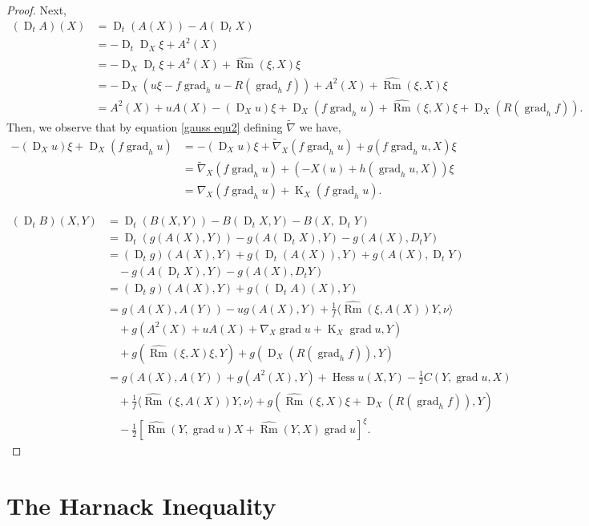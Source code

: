 \documentclass{amsart}
\theoremstyle{definition}
\theoremstyle{remark}
\newcommand{\ip}[2]{\ensuremath{\langle{#1},{#2}\rangle}}
\DeclareMathOperator{\grad}{grad}
\DeclareMathOperator{\Rm}{Rm}
\DeclareMathOperator{\hess}{Hess}
\DeclareMathOperator{\diff}{K}
\DeclareMathOperator{\D}{D}
\numberwithin{equation}{section}
\begin{document}
\begin{proof}
Next,
\[
\begin{split}
(\D_t A)(X) &= \D_t (A(X)) - A(\D_t X) \\
&= - \D_t \D_X \xi + A^2(X) \\
&= -\D_X \D_t \xi + A^2(X) + \widehat{\Rm} (\xi, X) \xi \\
&= -\D_X \left(u\xi - f\grad_h u - R(\grad_h f)\right) + A^2(X) + \widehat{\Rm} (\xi, X) \xi \\
&= A^2(X) + u A(X) -(\D_X u)\xi + \D_X (f\grad_h u) + \widehat{\Rm} (\xi, X) \xi + \D_X (R(\grad_h f)).
\end{split}
\]
Then, we observe that by equation \eqref{gauss equ2} defining $\tilde{\nabla}$ we have,
\[
\begin{split}
-(\D_X u)\xi + \D_X (f\grad_h u) &= -(\D_X u)\xi + \tilde{\nabla}_X (f\grad_h u) + g(f \grad_h u, X) \xi \\
&= \tilde{\nabla}_X (f\grad_h u) + (-X(u) + h(\grad_h u, X))\xi \\
&= \nabla_X (f\grad_h u) + \diff_X (f\grad_h u).
\end{split}
\]

\[
\begin{split}
(\D_t B) (X, Y) &= \D_t (B(X, Y)) - B(\D_t X, Y) - B(X, \D_t Y) \\
&= \D_t (g(A(X), Y)) - g(A(\D_tX), Y) - g(A(X), D_t Y) \\
&= (\D_t g)(A(X), Y) + g(\D_t(A(X)), Y) + g(A(X), \D_t Y) \\
&\quad - g(A(\D_tX), Y) - g(A(X), D_t Y) \\
&= (\D_t g)(A(X), Y) + g((\D_t A)(X), Y) \\
&= g(A(X), A(Y)) - u g(A(X), Y) + \frac{1}{f} \ip{\hat{\Rm} (\xi, A(X))Y}{\nu} \\
&\quad + g(A^2(X) + u A(X) + \nabla_X \grad u + \diff_X \grad u, Y) \\
&\quad + g(\widehat{\Rm}(\xi, X)\xi, Y) + g(\D_X (R(\grad_h f)), Y) \\
&= g(A(X), A(Y)) + g(A^2(X), Y) + \hess u (X, Y) -\frac{1}{2} C(Y, \grad u, X) \\
&\quad +\frac{1}{f} \ip{\hat{\Rm} (\xi, A(X))Y}{\nu} + g(\widehat{\Rm}(\xi, X)\xi  + \D_X (R(\grad_h f)), Y) \\
&\quad -\frac{1}{2} \left[\widehat{\Rm} (Y, \grad u)X +  \widehat{\Rm} (Y, X) \grad u\right]^{\xi}.
\end{split}
\]
\end{proof}

\section{The Harnack Inequality}
\end{document}
